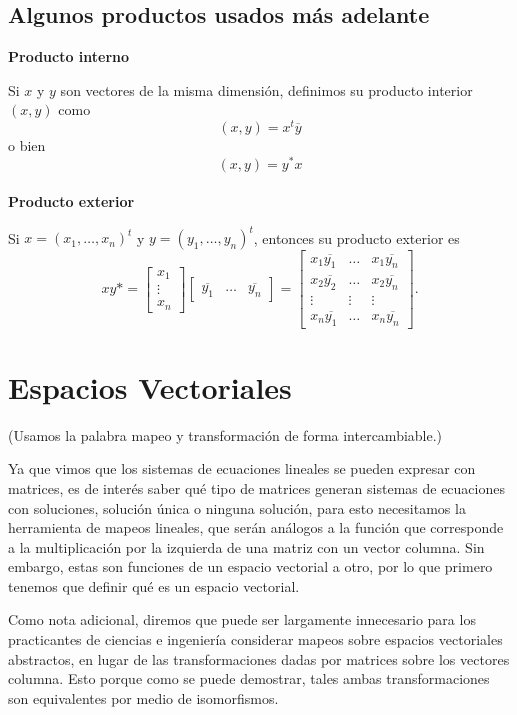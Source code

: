 \documentclass{article}
\begin{document}
\subsection{Algunos productos usados más adelante}
\textbf{Producto interno}

Si $x$ y $y$ son vectores de la misma dimensión, definimos su
producto interior $(x,y)$ como
\[(x,y) = x^t \overline y\]
o bien
\[(x,y) = y^* x\]
\\
\textbf{Producto exterior}

Si $x=(x_1,\ldots,x_n)^t$ y $y=(y_1,\ldots, y_n)^t$, entonces
su producto exterior es
$$x y* =
\begin{bmatrix} x_1 \\ \vdots \\ x_n \end{bmatrix}
\begin{bmatrix}
    \overline{y_1} & \ldots & \overline{y_n}
\end{bmatrix} =
\begin{bmatrix}
    x_1 \overline {y_1} & \ldots & x_1 \overline {y_n} \\
    x_2 \overline{y_2} & \ldots & x_2 \overline{y_n} \\
    \vdots & \vdots & \vdots \\
    x_n \overline{y_1} & \ldots & x_n \overline{y_n}
\end{bmatrix}.
$$
\newpage

\section{Espacios Vectoriales}
(Usamos la palabra mapeo y transformación de forma intercambiable.)

Ya que vimos que los sistemas de ecuaciones lineales se pueden expresar con matrices, es de interés saber qué tipo de matrices generan sistemas de ecuaciones con soluciones, solución única o ninguna solución, para esto necesitamos la herramienta de mapeos lineales, que serán análogos a la función que corresponde a la multiplicación por la izquierda de una matriz con un vector columna. Sin embargo, estas son funciones de un espacio vectorial a otro, por lo que primero tenemos que definir qué es un espacio vectorial.

Como nota adicional, diremos que puede ser largamente innecesario para los practicantes de ciencias e ingeniería considerar mapeos sobre espacios vectoriales abstractos, en lugar de las transformaciones dadas por matrices sobre los vectores columna. Esto porque como se puede demostrar, tales ambas transformaciones son equivalentes por medio de isomorfismos.
\end{document}
